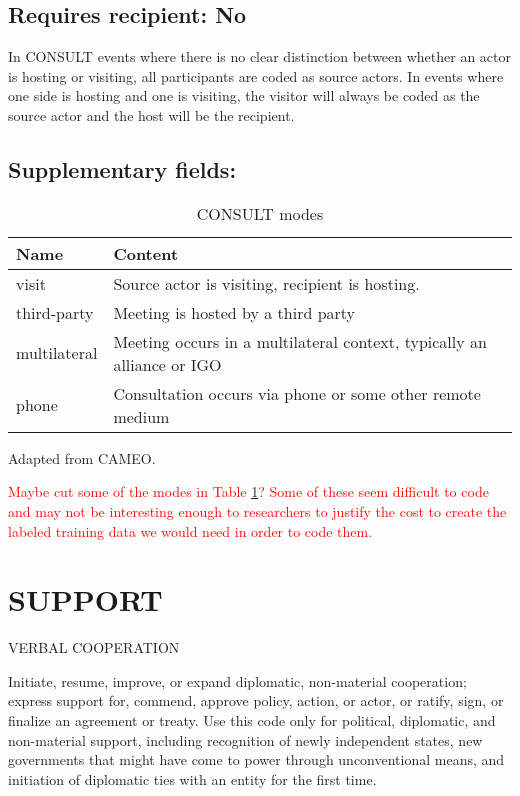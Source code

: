 \documentclass[11pt]{report}
\newcommand{\plcat}[1]{\textsf{#1}}
\newcommand{\andy}[1]{\textcolor{red}{#1}}
\begin{document}
\subsection{Requires recipient: No}

In \plcat{CONSULT} events where there is no clear distinction between whether an actor is hosting or visiting, all participants are coded as source actors. In events where one side is hosting and one is visiting, the visitor will always be coded as the source actor and the host will be the recipient.

\subsection{Supplementary fields: }

\begin{table}[htp]
\caption{CONSULT modes}
\begin{center}
\begin{tabular}{|l|p{13cm}|}
\hline
Name & Content \\
\hline
visit & Source actor is visiting, recipient is hosting.\\
third-party & Meeting is hosted by a third party\\
multilateral & Meeting occurs in a multilateral context, typically an alliance or IGO\\
phone & Consultation occurs via phone or some other remote medium\\
\hline
\end{tabular}
\end{center}
\label{tab:consultmode}
Adapted from CAMEO.
\end{table}%

\andy{Maybe cut some of the modes in Table \ref{tab:consultmode}? Some of these seem difficult to code and may not be interesting enough to researchers to justify the cost to create the labeled training data we would need in order to code them.}

\newpage

\section{SUPPORT}

\textsf{VERBAL COOPERATION} \vspace{8pt}

Initiate, resume, improve, or expand diplomatic, non-material cooperation; express support for, commend, approve policy, action, or actor, or ratify, sign, or finalize an agreement or treaty. Use this code only for political, diplomatic, and non-material support, including recognition of newly independent states, new governments that might have come to power through unconventional means, and initiation of diplomatic ties with an entity for the first time. 
\end{document}
